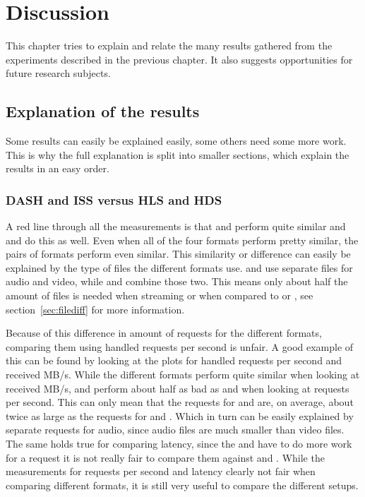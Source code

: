 \documentclass[twoside,openright]{uva-bachelor-thesis}
\begin{document}
\chapter{Discussion}
This chapter tries to explain and relate the many results gathered from the
experiments described in the previous chapter. It also suggests opportunities for
future research subjects.

\section{Explanation of the results}
Some results can easily be explained easily, some others need some more
work. This is why the full explanation is split into smaller sections, which
explain the results in an easy order.

\subsection{DASH and ISS versus HLS and HDS}\label{sec:audiovs}
A red line through all the measurements is that \hls and \hds perform
quite similar and \dash and \iss do this as well. Even when all of the four
formats perform pretty similar, the pairs of formats perform even similar.
This similarity or difference can easily be explained by the type of files the
different formats use. \dash and \iss use
separate files for audio and video, while \hls and \hds combine those two. This
means only about half the amount of files is needed when streaming \hls or \hds
when compared to \dash or \iss, see section~\ref{sec:filediff} for more
information.

Because of this difference in amount of requests for the different formats,
comparing them using handled requests per second is unfair. A good example of
this can be found by looking at the plots for handled requests per second and
received MB/s. While the different formats perform quite similar when looking at
received MB/s, \hls and \hds perform about half as bad as \dash and \iss when
looking at requests per second. This can only mean that the requests for \hds
and \hls are, on average, about twice as large as the requests for \dash and
\iss. Which in turn can be easily explained by separate requests for audio,
since audio files are much smaller than video files. The same holds true for
comparing latency, since the \hls and \hds have to do more work for a request it
is not really fair to compare them against \dash and \iss. While the
measurements for requests per second and latency clearly not fair when comparing
different formats, it is still very useful to compare the different setups.
\end{document}
